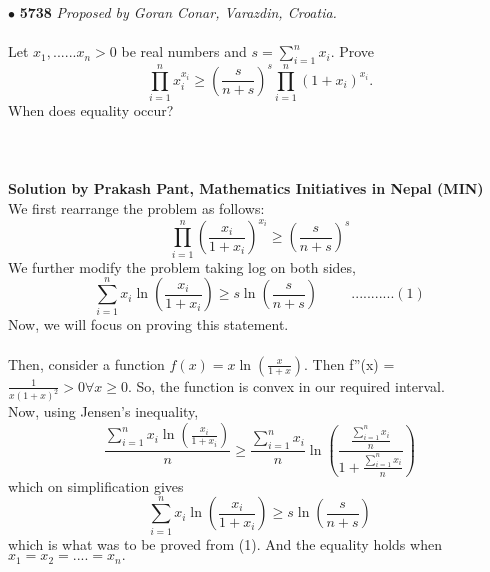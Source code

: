 \documentclass[12pt]{article}
\begin{document}
$\bullet$ 
\textbf{5738}
\emph{Proposed by Goran Conar, Varazdin, Croatia.} \\ \\
 Let $x_1,......x_n >0 $  be real numbers and $s = \sum_{i=1}^{n} x_i $. Prove \\
\[ \prod_{i=1}^{n} x_i^{x_i} \ge  (\frac{s}{n+s})^s \prod_{i=1}^{n} {(1+x_i)}^{x_i}.	\]
When does equality occur? \\ \\ \\ \\ 

\textbf{Solution by Prakash Pant, Mathematics Initiatives in Nepal (MIN)} \\

We first rearrange the problem as follows:\\
\[ \prod_{i=1}^{n} (\frac{x_i}{1+x_i})^{x_i}\ge  (\frac{s}{n+s})^s  					\]
We further modify the problem taking log on both sides, \\
\[ \sum_{i=1}^{n} x_i \ln(\frac{x_i}{1+x_i})	\ge s \ln(\frac{s}{n+s}) \hspace{1cm} ...........(1)				\]
Now, we will focus on proving this statement. \\ \\ 
Then, consider a function $ f(x) = x \ln (\frac{x}{1+x})$. Then f''(x) = $\frac{1}{x(1+x)^2}>0 \forall x \ge 0 $. So, the function is convex in our required interval. \\
Now, using Jensen's inequality,\\
\[	\frac{\sum_{i=1}^{n} x_i \ln(\frac{x_i}{1+x_i})}{n}	\ge \frac{\sum_{i=1}^{n} x_i}{n} 
\ln(\frac{ \frac{\sum_{i=1}^{n} x_i}{n}}{1 + \frac{\sum_{i=1}^{n} x_i}{n}} )						\]		
which on simplification gives
\[	\sum_{i=1}^{n} x_i \ln(\frac{x_i}{1+x_i})\ge s
\ln(\frac{s}{n+s} )						\]	
which is what was to be proved from (1). And the equality holds when $ x_1 = x_2 = ....=x_n .$
					
\end{document}
